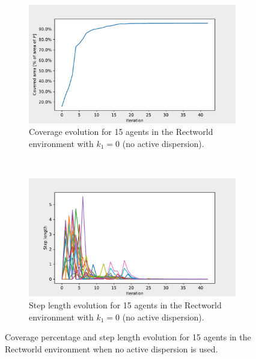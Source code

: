 \begin{figure}[H]
  \centering
  \begin{subfigure}[t]{0.5\textwidth}
    \centering
    \includegraphics[width=\textwidth]{figs/bigworld_15_agnt_k_1_0_k_2_1_area_traj.pdf}
    \caption{Coverage evolution for 15 agents in the Rectworld environment with $k_{1} = 0$ (no active dispersion).}
    \label{fig:15_agnt_bw_k_1_0_a_traj}
  \end{subfigure}%
  ~ 
  \begin{subfigure}[t]{0.5\textwidth}
    \centering
    \includegraphics[width=\textwidth]{figs/bigworld_15_agnt_k_1_0_k_2_1_step_traj.pdf}
    \caption{Step length evolution for 15 agents in the Rectworld environment with $k_{1} = 0$ (no active dispersion).}
    \label{fig:15_agnt_bw_k_1_0_s_traj}
  \end{subfigure}
  \caption{Coverage percentage and step length evolution for 15 agents in the Rectworld environment when no active dispersion is used.}
  \label{fig:15_agnt_bw_evolution}
\end{figure}


